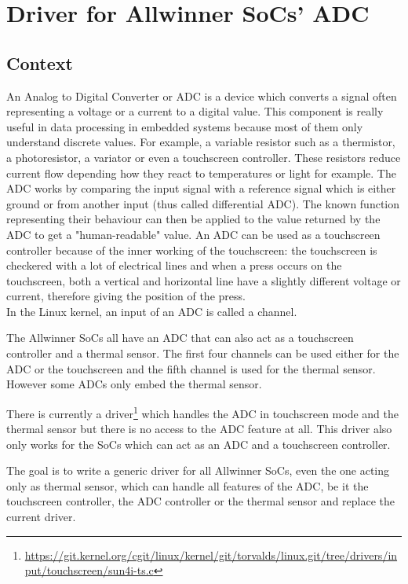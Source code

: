 \chapter{Driver for Allwinner SoCs' ADC}
\section{Context}

An Analog to Digital Converter or ADC is a device which converts a signal often representing a voltage or a current to a digital value. This component is really useful in data processing in embedded systems because most of them only understand discrete values. For example, a variable resistor such as a thermistor, a photoresistor, a variator or even a touchscreen controller. These resistors reduce current flow depending how they react to temperatures or light for example. The ADC works by comparing the input signal with a reference signal which is either ground or from another input (thus called differential ADC). The known function representing their behaviour can then be applied to the value returned by the ADC to get a "human-readable" value. An ADC can be used as a touchscreen controller because of the inner working of the touchscreen: the touchscreen is checkered with a lot of electrical lines and when a press occurs on the touchscreen, both a vertical and horizontal line have a slightly different voltage or current, therefore giving the position of the press.\\
In the Linux kernel, an input of an ADC is called a channel.

The Allwinner SoCs all have an ADC that can also act as a touchscreen controller and a thermal sensor. The first four channels can be used either for the ADC or the touchscreen and the fifth channel is used for the thermal sensor. However some ADCs only embed the thermal sensor.

There is currently a driver\footnote{\url{https://git.kernel.org/cgit/linux/kernel/git/torvalds/linux.git/tree/drivers/input/touchscreen/sun4i-ts.c}} which handles the ADC in touchscreen mode and the thermal sensor but there is no access to the ADC feature at all. This driver also only works for the SoCs which can act as an ADC and a touchscreen controller.

The goal is to write a generic driver for all Allwinner SoCs, even the one acting only as thermal sensor, which can handle all features of the ADC, be it the touchscreen controller, the ADC controller or the thermal sensor and replace the current driver.

